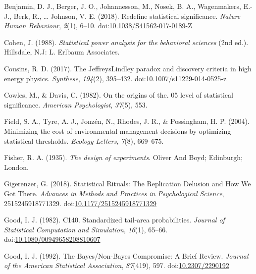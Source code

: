 \documentclass[,jou,floatsintext]{apa6}
\begin{document}
\leavevmode\hypertarget{ref-benjamin_redefine_2018}{}%
Benjamin, D. J., Berger, J. O., Johannesson, M., Nosek, B. A., Wagenmakers, E.-J., Berk, R., \ldots{} Johnson, V. E. (2018). Redefine statistical significance. \emph{Nature Human Behaviour}, \emph{2}(1), 6--10. doi:\href{https://doi.org/10.1038/S41562-017-0189-Z}{10.1038/S41562-017-0189-Z}

\leavevmode\hypertarget{ref-cohen_statistical_1988}{}%
Cohen, J. (1988). \emph{Statistical power analysis for the behavioral sciences} (2nd ed.). Hillsdale, N.J: L. Erlbaum Associates.

\leavevmode\hypertarget{ref-cousins_jeffreyslindley_2017}{}%
Cousins, R. D. (2017). The JeffreysLindley paradox and discovery criteria in high energy physics. \emph{Synthese}, \emph{194}(2), 395--432. doi:\href{https://doi.org/10.1007/s11229-014-0525-z}{10.1007/s11229-014-0525-z}

\leavevmode\hypertarget{ref-cowles_origins_1982}{}%
Cowles, M., \& Davis, C. (1982). On the origins of the. 05 level of statistical significance. \emph{American Psychologist}, \emph{37}(5), 553.

\leavevmode\hypertarget{ref-field_minimizing_2004}{}%
Field, S. A., Tyre, A. J., Jonzén, N., Rhodes, J. R., \& Possingham, H. P. (2004). Minimizing the cost of environmental management decisions by optimizing statistical thresholds. \emph{Ecology Letters}, \emph{7}(8), 669--675.

\leavevmode\hypertarget{ref-fisher_design_1935}{}%
Fisher, R. A. (1935). \emph{The design of experiments}. Oliver And Boyd; Edinburgh; London.

\leavevmode\hypertarget{ref-gigerenzer_statistical_2018}{}%
Gigerenzer, G. (2018). Statistical Rituals: The Replication Delusion and How We Got There. \emph{Advances in Methods and Practices in Psychological Science}, 2515245918771329. doi:\href{https://doi.org/10.1177/2515245918771329}{10.1177/2515245918771329}

\leavevmode\hypertarget{ref-good_c140._1982}{}%
Good, I. J. (1982). C140. Standardized tail-area probabilities. \emph{Journal of Statistical Computation and Simulation}, \emph{16}(1), 65--66. doi:\href{https://doi.org/10.1080/00949658208810607}{10.1080/00949658208810607}

\leavevmode\hypertarget{ref-good_bayesux2fnon-bayes_1992}{}%
Good, I. J. (1992). The Bayes/Non-Bayes Compromise: A Brief Review. \emph{Journal of the American Statistical Association}, \emph{87}(419), 597. doi:\href{https://doi.org/10.2307/2290192}{10.2307/2290192}
\end{document}

